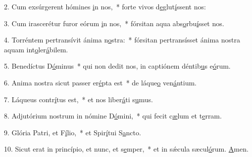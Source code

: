 2. Cum exsúrgerent hómines \uline{i}n nos,~* forte vivos d\uline{e}glut\uline{í}ssent nos:\par 
3. Cum irascerétur furor eórum \uline{i}n nos,~* fórsitan aqua abs\uline{o}rbu\uline{í}sset nos.\par 
4. Torréntem pertransívit ánima n\uline{o}stra:~* fórsitan pertransísset ánima nostra aquam int\uline{o}ler\uline{á}bilem.\par 
5. Benedíctus D\uline{ó}minus~* qui non dedit nos, in captiónem déntib\uline{u}s e\uline{ó}rum.\par 
6. Anima nostra sicut passer er\uline{é}pta est~* de láque\uline{o} ven\uline{á}ntium.\par 
7. Láqueus contr\uline{í}tus est,~* et nos liber\uline{á}ti s\uline{u}mus.\par 
8. Adjutórium nostrum in nómine D\uline{ó}mini,~* qui fecit c\uline{æ}lum et t\uline{e}rram.\par 
9. Glória Patri, et F\uline{í}lio,~* et Spir\uline{í}tui S\uline{a}ncto.\par 
10. Sicut erat in princípio, et nunc, et s\uline{e}mper,~* et in sǽcula sæcul\uline{ó}rum. \uline{A}men.\par 
